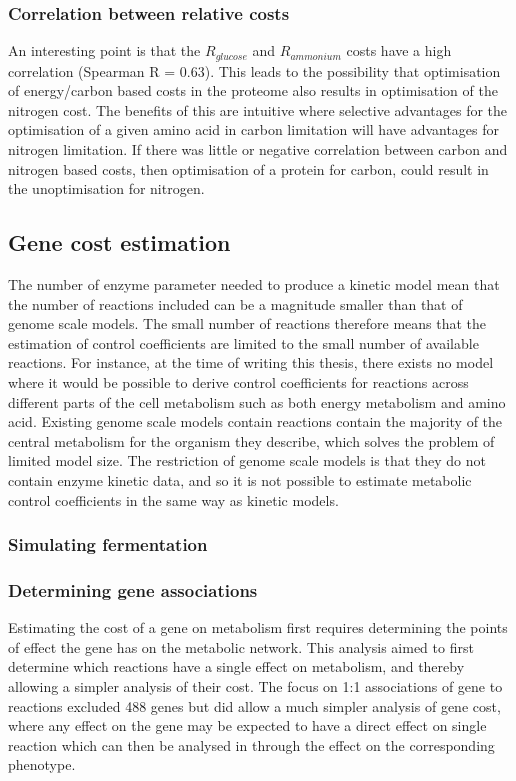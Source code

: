 \subsubsection{Correlation between relative costs}

An interesting point is that the $R_{glucose}$ and $R_{ammonium}$ costs have a high correlation (Spearman R = 0.63). This leads to the possibility that optimisation of energy/carbon based costs in the proteome also results in optimisation of the nitrogen cost. The benefits of this are intuitive where selective advantages for the optimisation of a given amino acid in carbon limitation will have advantages for nitrogen limitation. If there was little or negative correlation between carbon and nitrogen based costs, then optimisation of a protein for carbon, could result in the unoptimisation for nitrogen.

\subsection{Gene cost estimation}

The number of enzyme parameter needed to produce a kinetic model mean that the number of reactions included can be a magnitude smaller than that of genome scale models. The small number of reactions therefore means that the estimation of  control coefficients are limited to the small number of available reactions. For instance, at the time of writing this thesis, there exists no model where it would be possible to derive control coefficients for reactions across different parts of the cell metabolism such as both energy metabolism and amino acid. Existing genome scale models contain reactions contain the majority of the central metabolism for the organism they describe, which solves the problem of limited model size. The restriction of genome scale models is that they do not contain enzyme kinetic data, and so it is not possible to estimate metabolic control coefficients in the same way as kinetic models.

\subsubsection{Simulating fermentation}

\subsubsection{Determining gene associations}

Estimating the cost of a gene on metabolism first requires determining the points of effect the gene has on the metabolic network. This analysis aimed to first determine which reactions have a single effect on metabolism, and thereby allowing a simpler analysis of their cost. The focus on 1:1 associations of gene to reactions excluded 488 genes but did allow a much simpler analysis of gene cost, where any effect on the gene may be expected to have a direct effect on single reaction which can then be analysed in through the effect on the corresponding phenotype.

